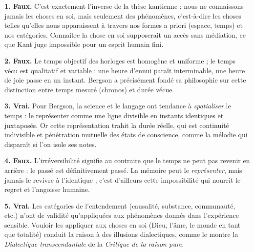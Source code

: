 \documentclass[11pt]{article}
\newcommand{\cle}[1]{{\popxbold\color{popdark}#1}}
\begin{document}
\begin{corrige}

\textbf{1. Faux.} C'est exactement l'inverse de la thèse kantienne : nous ne connaissons jamais les choses en soi, mais seulement des \cle{phénomènes}, c'est-à-dire les choses telles qu'elles nous apparaissent à travers nos formes a priori (espace, temps) et nos catégories. Connaître la chose en soi supposerait un accès sans médiation, ce que Kant juge impossible pour un esprit humain fini.

\textbf{2. Faux.} Le temps objectif des horloges est homogène et uniforme ; le temps vécu est qualitatif et variable : une heure d'ennui paraît interminable, une heure de joie passe en un instant. Bergson a précisément fondé sa philosophie sur cette distinction entre temps mesuré (\cle{chronos}) et \cle{durée} vécue.

\textbf{3. Vrai.} Pour Bergson, la science et le langage ont tendance à \emph{spatialiser} le temps : le représenter comme une ligne divisible en instants identiques et juxtaposés. Or cette représentation trahit la durée réelle, qui est continuité indivisible et pénétration mutuelle des états de conscience, comme la mélodie qui disparaît si l'on isole ses notes.

\textbf{4. Faux.} L'\cle{irréversibilité} signifie au contraire que le temps ne peut pas revenir en arrière : le passé est définitivement passé. La mémoire peut le \emph{représenter}, mais jamais le revivre à l'identique ; c'est d'ailleurs cette impossibilité qui nourrit le regret et l'angoisse humaine.

\textbf{5. Vrai.} Les catégories de l'entendement (causalité, substance, communauté, etc.) n'ont de validité qu'appliquées aux phénomènes donnés dans l'expérience sensible. Vouloir les appliquer aux choses en soi (Dieu, l'âme, le monde en tant que totalité) conduit la raison à des illusions dialectiques, comme le montre la \emph{Dialectique transcendantale} de la \emph{Critique de la raison pure}.
\end{corrige}
\end{document}
